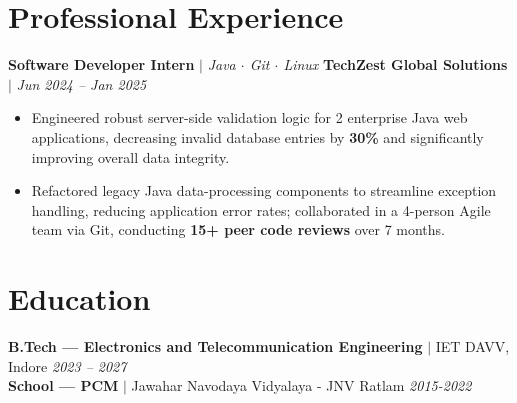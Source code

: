 \documentclass[a4paper,10pt]{article}
\begin{document}
\section*{Professional Experience}

\textbf{Software Developer Intern} $|$ \textit{Java $\cdot$ Git $\cdot$ Linux} \hfill \textbf{TechZest Global Solutions} $|$ \textit{Jun 2024 -- Jan 2025}
\begin{itemize}
  \item Engineered robust server-side validation logic for 2 enterprise Java web applications, decreasing invalid database entries by \textbf{30\%} and significantly improving overall data integrity.
  \item Refactored legacy Java data-processing components to streamline exception handling, reducing application error rates; collaborated in a 4-person Agile team via Git, conducting \textbf{15+ peer code reviews} over 7 months.
\end{itemize}

\section*{Education}
\textbf{B.Tech --- Electronics and Telecommunication Engineering} $|$ IET DAVV, Indore \hfill \textit{2023 -- 2027} \\
\textbf{School --- PCM} $|$ Jawahar Navodaya Vidyalaya - JNV Ratlam \hfill \textit{2015-2022}
\end{document}
